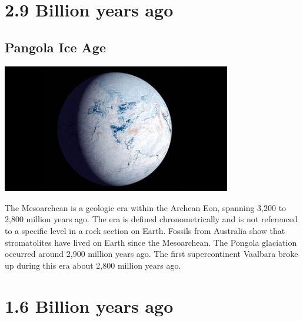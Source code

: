 \documentclass[11pt]{report}
\begin{document}
\chapter{2.9 Billion years ago}
\section{Pangola Ice Age}
\vspace{2mm}\begin{center}\includegraphics[width=10cm]{./img/iceage.jpg}\end{center}
The Mesoarchean is a geologic era within the Archean Eon, spanning 3,200 to 2,800 million years ago. The era is defined chronometrically and is not referenced to a specific level in a rock section on Earth. Fossils from Australia show that stromatolites have lived on Earth since the Mesoarchean. The Pongola glaciation occurred around 2,900 million years ago. The first supercontinent Vaalbara broke up during this era about 2,800 million years ago.

\chapter{1.6 Billion years ago}
\end{document}
